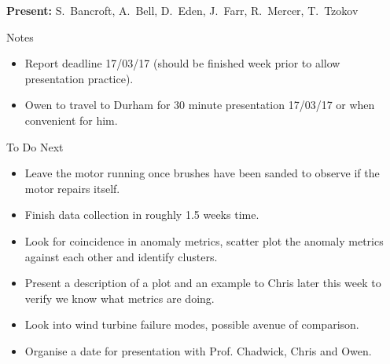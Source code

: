 \textbf{Present:} 
{S.~Bancroft,
  A.~Bell,
  D.~Eden,
  J.~Farr,
  R.~Mercer,
  T.~Tzokov}
  
\large{Notes}
\begin{itemize}
\item
Report deadline 17/03/17 (should be finished week prior to allow presentation practice).

\item
Owen to travel to Durham for 30 minute presentation 17/03/17 or when convenient for him.

\end{itemize}

\large{To Do Next}
\begin{itemize}
\item
Leave the motor running once brushes have been sanded to observe if the motor repairs itself.

\item
Finish data collection in roughly 1.5 weeks time.

\item
Look for coincidence in anomaly metrics, scatter plot the anomaly metrics against each other and identify clusters.

\item
Present a description of a plot and an example to Chris later this week to verify we know what metrics are doing.

\item
Look into wind turbine failure modes, possible avenue of comparison.

\item
Organise a date for presentation with Prof. Chadwick, Chris and Owen.

\end{itemize}

\noindent\makebox[\linewidth]{\rule{0.7\textwidth}{0.4pt}} \clearpage
